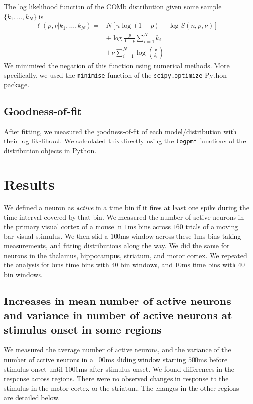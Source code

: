     The log likelihood function of the COMb distribution given some sample \\ $\lbrace k_1, \dots, k_N \rbrace$ is
    \begin{align}\label{eq:comb_log_like}
      \ell (p,\nu | k_1,\dots,k_N) =& N\left[n\log(1-p) - \log S(n,p,\nu)\right]  \\
        &+ \log \frac{p}{1-p} \sum_{i=1}^N k_i \\
        &+ \nu \sum_{i=1}^N \log \binom{n}{k_i}
    \end{align}
    We minimised the negation of this function using numerical methods. More specifically, we used the \texttt{minimise} function of the \texttt{scipy.optimize} Python package.

    \subsection{Goodness-of-fit}
    After fitting, we measured the goodness-of-fit of each model/distribution with their log likelihood. We calculated this directly using the \texttt{logpmf} functions of the distribution objects in Python.

\section{Results}
We defined a neuron as \textit{active} in a time bin if it fires at least one spike during the time interval covered by that bin. We measured the number of active neurons in the primary visual cortex of a mouse in $1$ms bins across $160$ trials of a moving bar visual stimulus. We then slid a $100$ms window across these $1$ms bins taking measurements, and fitting distributions along the way. We did the same for neurons in the thalamus, hippocampus, striatum, and motor cortex. We repeated the analysis for $5$ms time bins with $40$ bin windows, and $10$ms time bins with $40$ bin windows.

  \subsection{Increases in mean number of active neurons and variance in number of active neurons at stimulus onset in some regions}
  We measured the average number of active neurons, and the variance of the number of active neurons in a $100$ms sliding window starting $500$ms before stimulus onset until $1000$ms after stimulus onset. We found differences in the response across regions. There were no observed changes in response to the stimulus in the motor cortex or the striatum. The changes in the other regions are detailed below.

